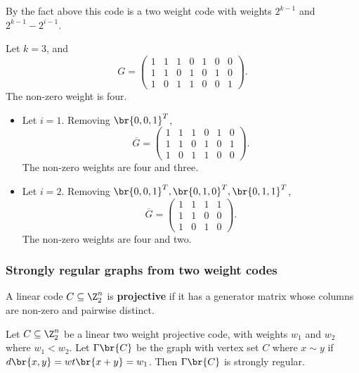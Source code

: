 By the fact above this code is a two weight code with weights $ 2^{k - 1} $ and $ 2^{k - 1} - 2^{i - 1} $.

\begin{example*}
Let $ k = 3 $, and
$$ G =
\begin{pmatrix}
1 & 1 & 1 & 0 & 1 & 0 & 0 \\
1 & 1 & 0 & 1 & 0 & 1 & 0 \\
1 & 0 & 1 & 1 & 0 & 0 & 1
\end{pmatrix}.
$$
The non-zero weight is four.
\begin{itemize}
\item Let $ i = 1 $. Removing $ \br{0, 0, 1}^T $,
$$ \overline{G} =
\begin{pmatrix}
1 & 1 & 1 & 0 & 1 & 0 \\
1 & 1 & 0 & 1 & 0 & 1 \\
1 & 0 & 1 & 1 & 0 & 0
\end{pmatrix}.
$$
The non-zero weights are four and three.
\item Let $ i = 2 $. Removing $ \br{0, 0, 1}^T, \br{0, 1, 0}^T, \br{0, 1, 1}^T $,
$$ \overline{G} =
\begin{pmatrix}
1 & 1 & 1 & 1 \\
1 & 1 & 0 & 0 \\
1 & 0 & 1 & 0
\end{pmatrix}.
$$
The non-zero weights are four and two.
\end{itemize}
\end{example*}

\pagebreak

\subsubsection{Strongly regular graphs from two weight codes}

\begin{definition*}
A linear code $ C \subseteq \Z_2^n $ is \textbf{projective} if it has a generator matrix whose columns are non-zero and pairwise distinct.
\end{definition*}

\begin{theorem}[Delsarte]
\label{thm:2.11}
Let $ C \subseteq \Z_2^n $ be a linear two weight projective code, with weights $ w_1 $ and $ w_2 $ where $ w_1 < w_2 $. Let $ \Gamma\br{C} $ be the graph with vertex set $ C $ where $ x \sim y $ if $ d\br{x, y} = wt\br{x + y} = w_1 $. Then $ \Gamma\br{C} $ is strongly regular.
\end{theorem}

